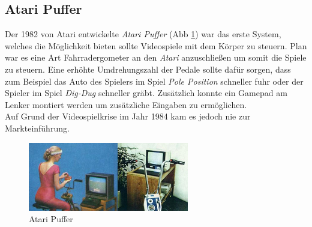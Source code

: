 \subsection{Atari Puffer}
Der 1982 von Atari entwickelte \textit{Atari Puffer} (Abb \ref{ataripuffer}) \cite{Sinclair:2007:CDE:1321261.1321313} war das erste System, welches die Möglichkeit bieten
sollte Videospiele mit dem Körper zu steuern. Plan war es eine Art Fahrradergometer an den \textit{Atari} 					anzuschließen um somit die Spiele zu steuern. Eine erhöhte Umdrehungszahl der Pedale sollte dafür sorgen,
dass zum Beispiel das Auto des Spielers im Spiel \textit{Pole Position} schneller fuhr oder der Spieler im Spiel
\textit{Dig-Dug} schneller gräbt. Zusätzlich konnte ein Gamepad am Lenker montiert werden um zusätzliche
Eingaben zu ermöglichen.\\
Auf Grund der Videospielkrise im Jahr 1984 kam es jedoch nie zur Markteinführung.\\
\begin{figure}[h]
	\centering
	\includegraphics[width=7cm]{gfx/recherche/ataripuffer.jpg} 
		\caption{Atari Puffer}
	\label{ataripuffer}
\end{figure}


